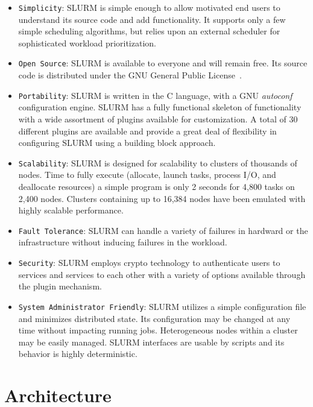 \documentclass[10pt,onecolumn,times]{../common/llncs}
\begin{document}
{\begin{itemize}
\item {\tt Simplicity}: SLURM is simple enough to allow motivated 
end users to understand its source code and add functionality. 
It supports only a few simple scheduling algorithms, 
but relies upon an external scheduler for sophisticated
workload prioritization.

\item {\tt Open Source}: SLURM is available to everyone and 
will remain free.
Its source code is distributed under the GNU General Public
License~\cite{GPL2002}.

\item {\tt Portability}: SLURM is written in the C language, 
with a GNU {\em autoconf} configuration engine.
SLURM has a fully functional skeleton of functionality with a
wide assortment of plugins available for customization. 
A total of 30 different plugins are available and provide a 
great deal of flexibility in configuring SLURM using a 
building block approach.

\item {\tt Scalability}: SLURM is designed for scalability to clusters 
of thousands of nodes. Time to fully execute (allocate, launch
tasks, process I/O, and deallocate resources) a simple program
is only 2 seconds for 4,800 tasks on 2,400 nodes. Clusters 
containing up to 16,384 nodes have been emulated with highly 
scalable performance. 

\item {\tt Fault Tolerance}: SLURM can handle a variety of failures
in hardward or the infrastructure without inducing failures in 
the workload.

\item {\tt Security}: SLURM employs crypto technology to authenticate
users to services and services to each other with a variety of options
available through the plugin mechanism.  

\item {\tt System Administrator Friendly}: SLURM utilizes
a simple configuration file and minimizes distributed state.
Its configuration may be changed at any time without impacting running
jobs.  Heterogeneous nodes within a cluster may be easily managed.  SLURM
interfaces are usable by scripts and its behavior is highly deterministic.

\end{itemize}

\section{Architecture}

}
\end{document}
